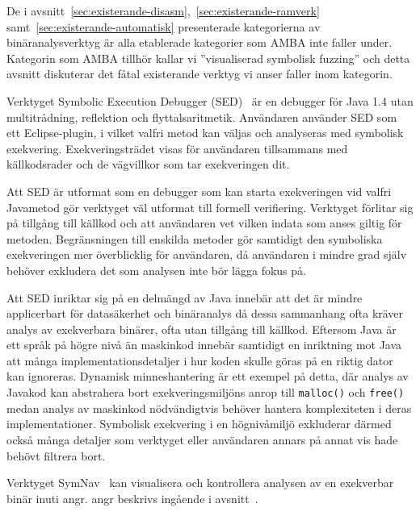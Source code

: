 De i avsnitt~\ref{sec:existerande-disasm},\ \ref{sec:existerande-ramverk} samt\
\ref{sec:existerande-automatisk} presenterade kategorierna av binäranalysverktyg
är alla etablerade kategorier som AMBA inte faller under. Kategorin som AMBA
tillhör kallar vi ''visualiserad symbolisk fuzzing'' och detta avsnitt
diskuterar det fåtal existerande verktyg vi anser faller inom kategorin.

Verktyget Symbolic Execution Debugger
(\textsc{SED})~\cite{symbolic_execution_debugger} är en debugger för Java 1.4
utan multitrådning, reflektion och flyttalsaritmetik. Användaren använder
\textsc{SED} som ett Eclipse-plugin, i vilket valfri metod kan väljas och
analyseras med symbolisk exekvering. Exekveringsträdet visas för användaren
tillsammans med källkodsrader och de vägvillkor som tar exekveringen dit.

Att \textsc{SED} är utformat som en debugger som kan starta exekveringen vid
valfri Javametod gör verktyget väl utformat till formell verifiering. Verktyget
förlitar sig på tillgång till källkod och att användaren vet vilken indata som
anses giltig för metoden. Begränsningen till enskilda metoder gör samtidigt den
symboliska exekveringen mer överblicklig för användaren, då användaren i mindre
grad själv behöver exkludera det som analysen inte bör lägga fokus på.

Att \textsc{SED} inriktar sig på en delmängd av Java innebär att det är mindre
applicerbart för datasäkerhet och binäranalys då dessa sammanhang ofta kräver
analys av exekverbara binärer, ofta utan tillgång till källkod. Eftersom Java är
ett språk på högre nivå än maskinkod innebär samtidigt en inriktning mot Java
att många implementationsdetaljer i hur koden skulle göras på en riktig dator
kan ignoreras. Dynamisk minneshantering är ett exempel på detta, där analys av
Javakod kan abstrahera bort exekveringsmiljöns anrop till \verb|malloc()| och
\verb|free()| medan analys av maskinkod nödvändigtvis behöver hantera
komplexiteten i deras implementationer. Symbolisk exekvering i en högnivåmiljö
exkluderar därmed också många detaljer som verktyget eller användaren annars på
annat vis hade behövt filtrera bort.

Verktyget SymNav~\cite{symnav} kan visualisera och kontrollera analysen av en
exekverbar binär inuti angr. angr beskrivs ingående i
avsnitt~\cite{sec:existerande-ramverk}.
